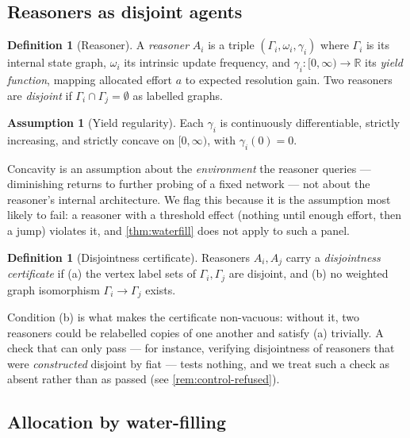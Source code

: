 \documentclass[11pt,twocolumn,a4paper]{article}
\theoremstyle{plain}
\theoremstyle{definition}
\newtheorem{definition}[theorem]{Definition}
\newtheorem{assumption}[theorem]{Assumption}
\theoremstyle{remark}
\newcommand{\Rset}{\mathbb{R}}
\begin{document}
\subsection{Reasoners as disjoint agents}

\begin{definition}[Reasoner]
\label{def:reasoner}
A \emph{reasoner} $A_i$ is a triple $(\Gamma_i, \omega_i, \gamma_i)$ where
$\Gamma_i$ is its internal state graph, $\omega_i$ its intrinsic update
frequency, and $\gamma_i : [0,\infty)\to\Rset$ its \emph{yield function},
mapping allocated effort $a$ to expected resolution gain. Two reasoners are
\emph{disjoint} if $\Gamma_i \cap \Gamma_j = \emptyset$ as labelled graphs.
\end{definition}

\begin{assumption}[Yield regularity]
\label{ass:concave}
Each $\gamma_i$ is continuously differentiable, strictly increasing, and
strictly concave on $[0,\infty)$, with $\gamma_i(0)=0$.
\end{assumption}

Concavity is an assumption about the \emph{environment} the reasoner queries ---
diminishing returns to further probing of a fixed network --- not about the
reasoner's internal architecture. We flag this because it is the assumption most
likely to fail: a reasoner with a threshold effect (nothing until enough effort,
then a jump) violates it, and \cref{thm:waterfill} does not apply to such a
panel.

\begin{definition}[Disjointness certificate]
\label{def:disjointness}
Reasoners $A_i, A_j$ carry a \emph{disjointness certificate} if
(a) the vertex label sets of $\Gamma_i,\Gamma_j$ are disjoint, and
(b) no weighted graph isomorphism $\Gamma_i \to \Gamma_j$ exists.
\end{definition}

Condition (b) is what makes the certificate non-vacuous: without it, two
reasoners could be relabelled copies of one another and satisfy (a) trivially.
A check that can only pass --- for instance, verifying disjointness of
reasoners that were \emph{constructed} disjoint by fiat --- tests nothing, and
we treat such a check as absent rather than as passed
(see \cref{rem:control-refused}).

\subsection{Allocation by water-filling}
\end{document}
